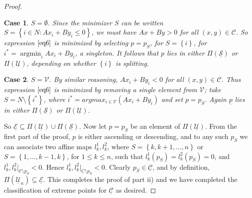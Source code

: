 \documentclass{article}
\theoremstyle{case}
\newtheorem{case}{Case}
\DeclareMathOperator*{\argmin}{argmin} %
\begin{document}
\begin{proof}
\setcounter{case}{0}
\begin{case} $S = \emptyset$. 
Since the minimizer $S$ can be written $S = \left\lbrace i \in N \colon Ax_i + By_i \leq 0 \right\rbrace$, we must have $Ax + By > 0$ for all $\left( x,y\right) \in \mathcal{C}$. So expression $\ref{eq6}$ is minimized by selecting $p = p_S$, for $S = \left\lbrace i\right\rbrace$, for $i^* = \argmin_i Ax_i + By_i$, a singleton. It follows that $p$ lies in either $\Pi\left( \underline{\mathcal{S}}\right)$ or $\Pi\left( \mathcal{\underline{U}}\right)$, depending on whether $\left\lbrace i\right\rbrace$ is splitting.
\end{case}

\begin{case} $S = \mathcal{V}$. By similar reasoning, $Ax_i + By_i < 0$ for all $\left( x,y\right) \in \mathcal{C}$. Thus expression $\ref{eq6}$ is minimized by removing a single element from $\mathcal{V}$; take $S = N\setminus \left\lbrace i^*\right\rbrace$, where $i^* = argmax_{i \in \mathcal{V}} \left( Ax_i + By_i\right)$ and set $p = p_S$. Again $\underline{p}$ lies in either $\Pi\left( \underline{\mathcal{S}}\right)$ or $\Pi\left( \mathcal{\underline{U}}\right)$.
\end{case}

So $\underline{\mathcal{E}} \subseteq \Pi\left( \mathcal{\underline{U}}\right) \cup \Pi\left( \mathcal{\underline{S}}\right)$. Now let $p = p_S$ be an element of $\Pi\left( \mathcal{\underline{U}}\right)$. From the first part of the proof, $p$ is either ascending or descending, and to any such $p_S$ we can associate two affine maps $l_k^1, l_k^2$, where $S = \left\lbrace k, k+1, \dots, n\right\rbrace$ or $S = \left\lbrace 1, \dots, k-1, k\right\rbrace$, for $1 \leq k \leq n$, such that $l_k^1\left( p_S\right) = l_k^2\left( p_S\right) = 0$, and $l_k^1, l_k^2 \vert_{\mathcal{C} \setminus p_S} < 0$. Hence $l_k^1, l_k^2 \vert_{\underline{C} \setminus p_S} < 0$. Clearly $p_S \in \underline{\mathcal{C}}$, and by definition, $ \Pi\left( \mathcal{\underline{U}}_n\right) \subseteq \underline{\mathcal{E}}$. This completes the proof of part ii) and we have completed the classification of extreme points for $\underline{\mathcal{C}}$ as desired.
\end{proof}
\end{document}
